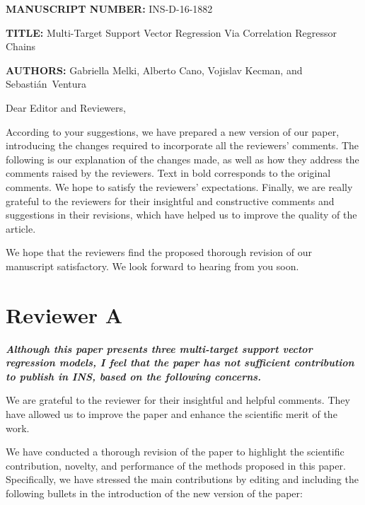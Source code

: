 \documentclass[a4paper,notitlepage]{article}
\begin{document}
\noindent \textbf{\small MANUSCRIPT NUMBER:} INS-D-16-1882

\noindent \textbf{\small TITLE:} {\small Multi-Target Support Vector Regression Via Correlation Regressor Chains}

\noindent \textbf{\small AUTHORS:} {\small Gabriella Melki, Alberto Cano, Vojislav Kecman, and Sebasti\'{a}n~Ventura}

\bigskip

\noindent Dear Editor and Reviewers,

\noindent According to your suggestions, we have prepared a new version of our paper, introducing the changes required to incorporate all the reviewers' comments.
The following is our explanation of the changes made, as well as how they address the comments raised by the reviewers. Text in bold corresponds to the original comments. We hope to satisfy the reviewers' expectations. Finally, we are really grateful to the reviewers for their insightful and constructive comments and suggestions in their revisions, which have helped us to improve the quality of the article.

\noindent We hope that the reviewers find the proposed thorough revision of our manuscript satisfactory. We look forward to hearing from you soon.

\section{Reviewer A}

\noindent \textbf{\textit{Although this paper presents three multi-target support vector regression models, I feel that the paper has not sufficient contribution to publish in INS, based on the following concerns.}}

\medskip

\noindent We are grateful to the reviewer for their insightful and helpful comments. They have allowed us to improve the paper and enhance the scientific merit of the work. 

\noindent We have conducted a thorough revision of the paper to highlight the scientific contribution, novelty, and performance of the methods proposed in this paper. Specifically, we have stressed the main contributions by editing and including the following bullets in the introduction of the new version of the paper:
\end{document}
